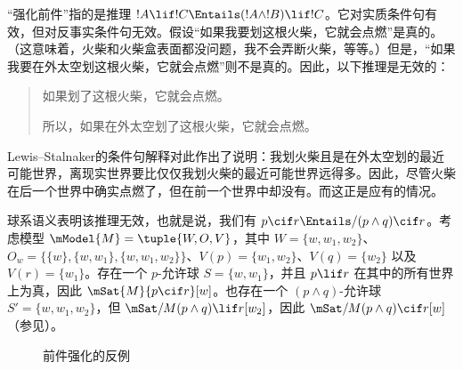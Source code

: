 \documentclass[../../../include/open-logic-section]{subfiles}
\begin{document}


“强化前件”指的是推理 $!A \lif !C \Entails (!A \land !B) \lif !C$。它对实质条件句有效，但对反事实条件句无效。假设“如果我要划这根火柴，它就会点燃”是真的。（这意味着，火柴和火柴盒表面都没问题，我不会弄断火柴，等等。）但是，“如果我要在外太空划这根火柴，它就会点燃”则不是真的。因此，以下推理是无效的：

\begin{quote}
  如果划了这根火柴，它就会点燃。

  所以，如果在外太空划了这根火柴，它就会点燃。
\end{quote}

Lewis--Stalnaker的条件句解释对此作出了说明：我划火柴且是在外太空划的最近可能世界，离现实世界要比仅仅我划火柴的最近可能世界远得多。因此，尽管火柴在后一个世界中确实点燃了，但在前一个世界中却没有。而这正是应有的情况。

\begin{ex}
  球系语义表明该推理无效，也就是说，我们有 $p
  \cif r \Entails/ (p \land q) \cif r$。考虑模型 $\mModel{M}
  = \tuple{W, O, V}$，其中 $W = \{w, w_1, w_2\}$、$O_w = \{\{w\}, \{w,
  w_1\}, \{w, w_1, w_2\}\}$、$V(p) = \{w_1, w_2\}$、$V(q) = \{w_2\}$ 以及 $V(r) = \{w_1\}$。存在一个 $p$-允许球 $S = \{w,
  w_1\}$，并且 $p \lif r$ 在其中的所有世界上为真，因此 $\mSat{M}{p
    \cif r}[w]$。也存在一个 $(p \land q)$-允许球 $S' =
  \{w, w_1, w_2\}$，但 $\mSat/{M}{(p \land q) \lif r}[w_2]$，因此 $\mSat/{M}{(p \land q) \cif r}[w]$（参见）。

\begin{figure}
\begin{center}
\caption{前件强化的反例}
\end{center}
\end{figure}
\end{ex}
\end{document}
